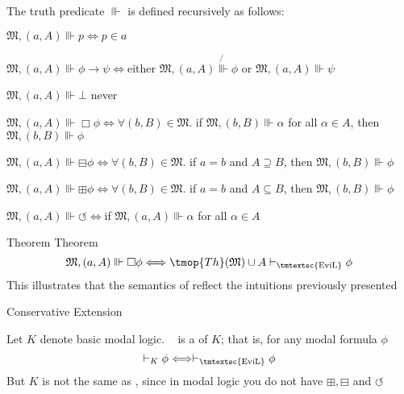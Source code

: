 \begin{itemizedot}
  \item The  truth predicate $\Vvdash$ is defined recursively
  as follows:
  \begin{itemizedot}
    \item $\mathfrak{M}, (a, A) \Vvdash p \Longleftrightarrow p \in a$
    
    \item $\mathfrak{M}, (a, A) \Vvdash \phi \rightarrow \psi
    \Longleftrightarrow$either $\mathfrak{M}, (a, A) \not{\Vvdash} \phi$ or
    $\mathfrak{M}, (a, A) \Vvdash \psi$
    
    \item $\mathfrak{M}, (a, A) \Vvdash \bot$ never
    
    \item $\mathfrak{M}, (a, A) \Vvdash \Box  \phi \Longleftrightarrow \forall
    (b, B) \in \mathfrak{M} .$ if $\mathfrak{M}, (b, B) \Vvdash \alpha$ for
    all $\alpha \in A$, then $\mathfrak{M}, (b, B) \Vvdash \phi$
    
    \item $\mathfrak{M}, (a, A) \Vvdash \boxminus \phi \Longleftrightarrow
    \forall (b, B) \in \mathfrak{M} .$ if $a = b$ and $A \supseteq B$, then
    $\mathfrak{M}, (b, B) \Vvdash \phi$
    
    \item $\mathfrak{M}, (a, A) \Vvdash \boxplus \phi \Longleftrightarrow
    \forall (b, B) \in \mathfrak{M} .$ if $a = b$ and $A \subseteq B$, then
    $\mathfrak{M}, (b, B) \Vvdash \phi$
    
    \item $\mathfrak{M}, (a, A) \Vvdash \circlearrowleft
    \Longleftrightarrow$if $\mathfrak{M}, (a, A) \Vvdash \alpha$ for all
    $\alpha \in A$
  \end{itemizedot}
\end{itemizedot}
Theorem Theorem
\[ \mathfrak{M}, (a, A) \Vvdash \Box  \phi \Longleftrightarrow \tmop{Th} (
   \mathfrak{M}) \cup A \vdash_{\text{\tmtextsc{EviL}}} \phi \]
This illustrates that the semantics of  reflect the intuitions
previously presented



Conservative Extension

Let $K$ denote basic modal logic. \  is a
 of $K$; that is, for any modal formula
$\phi$
\[ \vdash_K \phi \Longleftrightarrow \vdash_{\text{\tmtextsc{EviL}}} \phi \]
But $K$ is not the same as , since in modal logic you do not
have $\boxplus, \boxminus$ and $\circlearrowleft$



